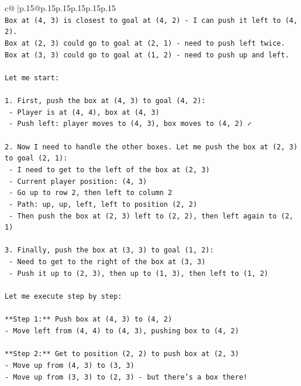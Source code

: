 \documentclass{article}
\begin{document}
{\begin{supertabular}{c@{$\;$}|p{.15\linewidth}@{}p{.15\linewidth}p{.15\linewidth}p{.15\linewidth}p{.15\linewidth}p{.15\linewidth}}
{{{\\ 
\texttt{Box at (4, 3) is closest to goal at (4, 2) {-} I can push it left to (4, 2).} \\
\texttt{Box at (2, 3) could go to goal at (2, 1) {-} need to push left twice.} \\
\texttt{Box at (3, 3) could go to goal at (1, 2) {-} need to push up and left.} \\
\\ 
\texttt{Let me start:} \\
\\ 
\texttt{1. First, push the box at (4, 3) to goal (4, 2):} \\
\texttt{   {-} Player is at (4, 4), box at (4, 3)} \\
\texttt{   {-} Push left: player moves to (4, 3), box moves to (4, 2) ✓} \\
\\ 
\texttt{2. Now I need to handle the other boxes. Let me push the box at (2, 3) to goal (2, 1):} \\
\texttt{   {-} I need to get to the left of the box at (2, 3)} \\
\texttt{   {-} Current player position: (4, 3)} \\
\texttt{   {-} Go up to row 2, then left to column 2} \\
\texttt{   {-} Path: up, up, left, left to position (2, 2)} \\
\texttt{   {-} Then push the box at (2, 3) left to (2, 2), then left again to (2, 1)} \\
\\ 
\texttt{3. Finally, push the box at (3, 3) to goal (1, 2):} \\
\texttt{   {-} Need to get to the right of the box at (3, 3)} \\
\texttt{   {-} Push it up to (2, 3), then up to (1, 3), then left to (1, 2)} \\
\\ 
\texttt{Let me execute step by step:} \\
\\ 
\texttt{**Step 1:** Push box at (4, 3) to (4, 2)} \\
\texttt{{-} Move left from (4, 4) to (4, 3), pushing box to (4, 2)} \\
\\ 
\texttt{**Step 2:** Get to position (2, 2) to push box at (2, 3)} \\
\texttt{{-} Move up from (4, 3) to (3, 3)} \\
\texttt{{-} Move up from (3, 3) to (2, 3) {-} but there's a box there!} \\
}}}
\end{supertabular}}
\end{document}
